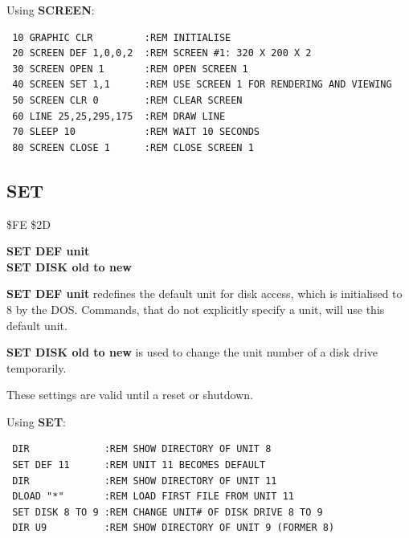 \begin{description}[leftmargin=2cm,style=nextline]
\item [Example:] Using {\bf SCREEN}:
\begin{tcolorbox}[colback=black,coltext=white]
\verbatimfont{\codefont}
\begin{verbatim}
 10 GRAPHIC CLR         :REM INITIALISE
 20 SCREEN DEF 1,0,0,2  :REM SCREEN #1: 320 X 200 X 2
 30 SCREEN OPEN 1       :REM OPEN SCREEN 1
 40 SCREEN SET 1,1      :REM USE SCREEN 1 FOR RENDERING AND VIEWING
 50 SCREEN CLR 0        :REM CLEAR SCREEN
 60 LINE 25,25,295,175  :REM DRAW LINE
 70 SLEEP 10            :REM WAIT 10 SECONDS
 80 SCREEN CLOSE 1      :REM CLOSE SCREEN 1
\end{verbatim}
\end{tcolorbox}
\end{description}


\newpage
\subsection{SET}
\begin{description}[leftmargin=2cm,style=nextline]
\item [Token:] \$FE \$2D
\item [Format:] {\bf SET DEF unit} \\
                {\bf SET DISK old to new}
\item [Usage:]  {\bf SET DEF unit} redefines the default unit
                for disk access, which is initialised to 8 by
                the DOS. Commands, that do not explicitly
                specify a unit, will use this default unit.

                {\bf SET DISK old to new} is used to change
                the unit number of a disk drive temporarily.

\item [Remarks:] These settings are valid until a reset
                 or shutdown.

\item [Example:] Using {\bf SET}:
\begin{tcolorbox}[colback=black,coltext=white]
\verbatimfont{\codefont}
\begin{verbatim}
 DIR             :REM SHOW DIRECTORY OF UNIT 8
 SET DEF 11      :REM UNIT 11 BECOMES DEFAULT
 DIR             :REM SHOW DIRECTORY OF UNIT 11
 DLOAD "*"       :REM LOAD FIRST FILE FROM UNIT 11
 SET DISK 8 TO 9 :REM CHANGE UNIT# OF DISK DRIVE 8 TO 9
 DIR U9          :REM SHOW DIRECTORY OF UNIT 9 (FORMER 8)
\end{verbatim}
\end{tcolorbox}
\end{description}

